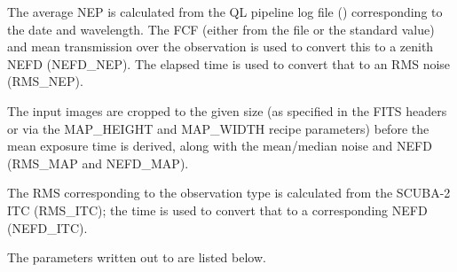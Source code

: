 \documentclass[11pt,oneside,chapters]{starlink}
\begin{document}
The average NEP is calculated from the QL pipeline log file ()
corresponding to the date and wavelength. The FCF (either from the file
or the standard value) and mean transmission over the observation is used
to convert this to a zenith NEFD (NEFD\_NEP). The elapsed time is used to
convert that to an RMS noise (RMS\_NEP).

The input images are cropped to the given size (as specified in the FITS
headers or via the MAP\_HEIGHT and MAP\_WIDTH recipe parameters) before the
mean exposure time is derived, along with the mean/median noise and NEFD
(RMS\_MAP and NEFD\_MAP).

The RMS corresponding to the observation type is calculated from the
SCUBA-2 ITC (RMS\_ITC); the time is used to convert that to a corresponding
NEFD (NEFD\_ITC).

The parameters written out to  are listed below.
\end{document}
